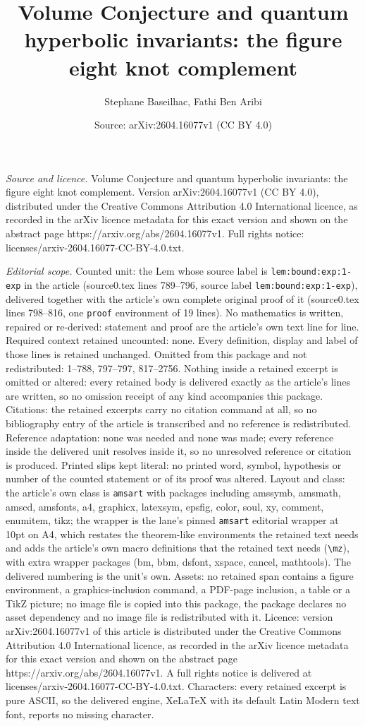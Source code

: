 \documentclass[10pt,a4paper]{amsart}
\title[Volume Conjecture and quantum hyperbolic invariants: the fig]{Volume Conjecture and quantum hyperbolic invariants: the figure eight knot complement}
\author{Stephane Baseilhac, Fathi Ben Aribi}
\date{Source: arXiv:2604.16077v1 (CC BY 4.0)}
\begin{document}
\maketitle

\noindent\emph{Source and licence.} Volume Conjecture and quantum hyperbolic invariants: the figure eight knot complement. Version arXiv:2604.16077v1 (CC BY 4.0), distributed under the Creative Commons Attribution 4.0 International licence, as recorded in the arXiv licence metadata for this exact version and shown on the abstract page https://arxiv.org/abs/2604.16077v1. Full rights notice: licenses/arxiv-2604.16077-CC-BY-4.0.txt.\par\smallskip

\noindent\textit{Editorial scope.} Counted unit: the Lem whose source label is \texttt{lem:bound:exp:1-exp} in the article (source0.tex lines 789--796, source label \texttt{lem:bound:exp:1-exp}), delivered together with the article's own complete original proof of it (source0.tex lines 798--816, one \texttt{proof} environment of 19 lines). No mathematics is written, repaired or re-derived: statement and proof are the article's own text line for line. Required context retained uncounted: none. Every definition, display and label of those lines is retained unchanged. Omitted from this package and not redistributed: 1--788, 797--797, 817--2756. Nothing inside a retained excerpt is omitted or altered: every retained body is delivered exactly as the article's lines are written, so no omission receipt of any kind accompanies this package. Citations: the retained excerpts carry no citation command at all, so no bibliography entry of the article is transcribed and no reference is redistributed. Reference adaptation: none was needed and none was made; every reference inside the delivered unit resolves inside it, so no unresolved reference or citation is produced. Printed slips kept literal: no printed word, symbol, hypothesis or number of the counted statement or of its proof was altered. Layout and class: the article's own class is \texttt{amsart} with packages including amssymb, amsmath, amscd, amsfonts, a4, graphicx, latexsym, epsfig, color, soul, xy, comment, enumitem, tikz; the wrapper is the lane's pinned \texttt{amsart} editorial wrapper at 10pt on A4, which restates the theorem-like environments the retained text needs and adds the article's own macro definitions that the retained text needs (\texttt{\textbackslash mz}), with extra wrapper packages (bm, bbm, dsfont, xspace, cancel, mathtools). The delivered numbering is the unit's own. Assets: no retained span contains a figure environment, a graphics-inclusion command, a PDF-page inclusion, a table or a TikZ picture; no image file is copied into this package, the package declares no asset dependency and no image file is redistributed with it. Licence: version arXiv:2604.16077v1 of this article is distributed under the Creative Commons Attribution 4.0 International licence, as recorded in the arXiv licence metadata for this exact version and shown on the abstract page https://arxiv.org/abs/2604.16077v1. A full rights notice is delivered at licenses/arxiv-2604.16077-CC-BY-4.0.txt. Characters: every retained excerpt is pure ASCII, so the delivered engine, XeLaTeX with its default Latin Modern text font, reports no missing character.
\end{document}
